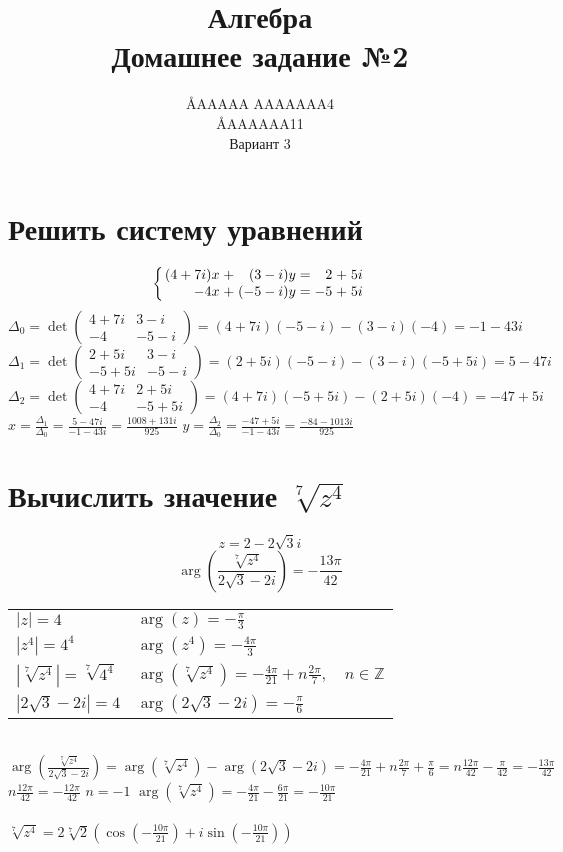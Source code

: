 \documentclass{article}
\title{Алгебра \\ Домашнее задание №2}
\author{\AA{AAAAA AAAAAAA}{4} \\ \AA{AAAAAA}{11} \\ Вариант 3}
\newcommand{\ds}{\displaystyle}
\newcommand{\abs}[1]{\left|#1\right|}
\newcommand{\Arg}[1]{\arg\left(#1\right)}
\newcommand{\TrigFrom}[1]{
  \left(\cos\left({#1}\right)+i\sin\left({#1}\right)\right)
}
\begin{document}
  \maketitle

  \section{Решить систему уравнений}
  \[
    \left\{
      \arraycolsep=1.4pt
      \begin{array}{rrrrrrr}
        (4+7i)x &+& (3-i)y &=& 2&+&5i \\
        -4x &+& (-5-i)y &=& -5&+&5i
      \end{array}
    \right.
  \]
  $\ds \Delta_0 = \det\begin{pmatrix}
    4+7i & 3-i \\
    -4 & -5-i
  \end{pmatrix} = (4+7i)(-5-i)-(3-i)(-4) = -1-43i$
  \\
  $\ds \Delta_1 = \det\begin{pmatrix}
    2+5i & 3-i \\
    -5+5i & -5-i
  \end{pmatrix} = (2+5i)(-5-i)-(3-i)(-5+5i) = 5-47i$
  \\
  $\ds \Delta_2 = \det\begin{pmatrix}
    4+7i & 2+5i \\
    -4 & -5+5i
  \end{pmatrix} = (4+7i)(-5+5i)-(2+5i)(-4) = -47+5i$
  \\
  $\ds x = \frac{\Delta_1}{\Delta_0} = \frac{5-47i}{-1-43i} = \frac{1008 + 131i}{925}$ \quad
  $\ds y = \frac{\Delta_2}{\Delta_0} = \frac{-47+5i}{-1-43i} = \frac{-84 - 1013i}{925}$

  \section{Вычислить значение $\sqrt[7]{z^4}$}
  $$ z = 2 - 2\sqrt{3}i $$
  $$ \Arg{ \frac{\sqrt[7]{z^4}}{2\sqrt{3} - 2i} } = -\frac{13\pi}{42} $$
  \begin{tabular}{ll}
    $\ds \abs{z} = 4$ & $\ds \Arg z = -\frac{\pi}{3}$ \\
    $\ds \abs{z^4} = 4^4$ & $\ds \Arg{z^4} = -\frac{4\pi}{3}$ \\
    $\ds \abs{\sqrt[7]{z^4}} = \sqrt[7]{4^4}$ & $\ds \Arg{\sqrt[7]{z^4}} = -\frac{4\pi}{21} + n\frac{2\pi}{7},\quad n\in\mathbb{Z}$ \\
    $\ds \abs{2\sqrt{3} - 2i} = 4$ & $\ds \Arg{2\sqrt{3} - 2i} = -\frac{\pi}{6}$
  \end{tabular} \\
  $\ds \Arg{ \frac{\sqrt[7]{z^4}}{2\sqrt{3} - 2i} }
    = \Arg{\sqrt[7]{z^4}} - \Arg{2\sqrt{3} - 2i}
    = -\frac{4\pi}{21} + n\frac{2\pi}{7} + \frac{\pi}{6}
    = n\frac{12\pi}{42} - \frac{\pi}{42}
    = -\frac{13\pi}{42}
  $ \\
  $\ds n\frac{12\pi}{42} = -\frac{12\pi}{42}$ \quad $n = -1$ \quad
  $\ds \Arg{\sqrt[7]{z^4}} = -\frac{4\pi}{21} - \frac{6\pi}{21} = -\frac{10\pi}{21}$ \\ \\
  $\ds \sqrt[7]{z^4} = 2\sqrt[7]{2} \TrigFrom{-\frac{10\pi}{21}}$
\end{document}
